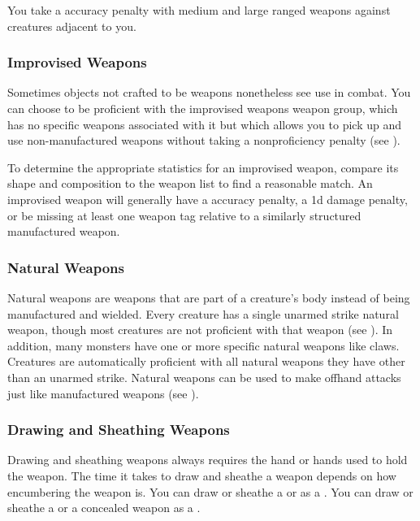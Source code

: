                 You take a  accuracy penalty with medium and large ranged weapons against creatures adjacent to you.

        \subsubsection{Improvised Weapons}\label{Improvised Weapons}
            Sometimes objects not crafted to be weapons nonetheless see use in combat.
            You can choose to be proficient with the improvised weapons weapon group, which has no specific weapons associated with it but which allows you to pick up and use non-manufactured weapons without taking a nonproficiency penalty (see ).

            To determine the appropriate statistics for an improvised weapon, compare its shape and composition to the weapon list to find a reasonable match.
            An improvised weapon will generally have a  accuracy penalty, a \minus1d damage penalty, or be missing at least one weapon tag relative to a similarly structured manufactured weapon.

        \subsubsection{Natural Weapons}\label{Natural Weapons}
            Natural weapons are weapons that are part of a creature's body instead of being manufactured and wielded.
            Every creature has a single unarmed strike natural weapon, though most creatures are not proficient with that weapon (see ).
            In addition, many monsters have one or more specific natural weapons like claws.
            Creatures are automatically proficient with all natural weapons they have other than an unarmed strike.
            Natural weapons can be used to make offhand attacks just like manufactured weapons (see ).

        \subsubsection{Drawing and Sheathing Weapons}\label{Drawing and Sheathing Weapons}
            Drawing and sheathing weapons always requires the hand or hands used to hold the weapon.
            The time it takes to draw and sheathe a weapon depends on how encumbering the weapon is.
            You can draw or sheathe a  or  as a .
            You can draw or sheathe a  or a concealed weapon as a .

